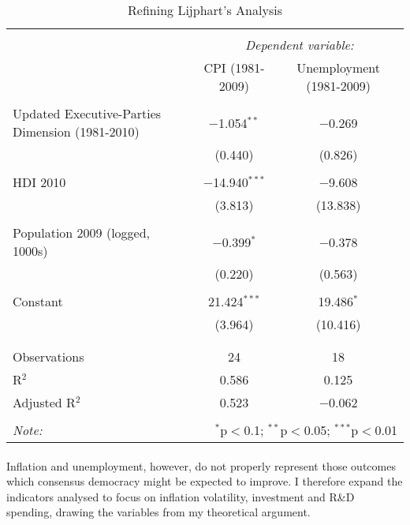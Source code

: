 \documentclass[11pt, oneside]{article}   	%
\let\oldparagraph\paragraph
\renewcommand{\paragraph}[1]{\oldparagraph{#1}\mbox{}}
\begin{document}
\begin{table}[!htbp] \centering 
  \caption{ Refining Lijphart's Analysis} 
  \label{} 
\small 
\begin{tabular}{@{\extracolsep{-10pt}}lcc} 
\\[-1.8ex]\hline 
\hline \\[-1.8ex] 
 & \multicolumn{2}{c}{\textit{Dependent variable:}} \\ 
\cline{2-3} 
 & CPI (1981-2009) & Unemployment (1981-2009) \\ 
\hline \\[-1.8ex] 
 Updated Executive-Parties Dimension (1981-2010) & $-$1.054$^{**}$ & $-$0.269 \\ 
  & (0.440) & (0.826) \\ 
  & & \\ 
 HDI 2010 & $-$14.940$^{***}$ & $-$9.608 \\ 
  & (3.813) & (13.838) \\ 
  & & \\ 
 Population 2009 (logged, 1000s) & $-$0.399$^{*}$ & $-$0.378 \\ 
  & (0.220) & (0.563) \\ 
  & & \\ 
 Constant & 21.424$^{***}$ & 19.486$^{*}$ \\ 
  & (3.964) & (10.416) \\ 
  & & \\ 
\hline \\[-1.8ex] 
Observations & 24 & 18 \\ 
R$^{2}$ & 0.586 & 0.125 \\ 
Adjusted R$^{2}$ & 0.523 & $-$0.062 \\ 
\hline 
\hline \\[-1.8ex] 
\textit{Note:}  & \multicolumn{2}{r}{$^{*}$p$<$0.1; $^{**}$p$<$0.05; $^{***}$p$<$0.01} \\ 
\end{tabular} 
\end{table} 



\paragraph{}
Inflation and unemployment, however, do not properly represent those outcomes which consensus democracy might be expected to improve. I therefore expand the indicators analysed to focus on inflation volatility, investment and R\&D spending, drawing the variables from my theoretical argument.
\end{document}
